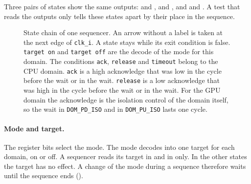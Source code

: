 Three pairs of states show the same outputs:  and ,  and , and  and . A test that reads the outputs only tells these states apart by their place in the sequence.

\begin{figure}[ht]
  \centering
  \caption{State chain of one sequencer. An arrow without a label is taken at the next edge of \texttt{clk\_i}. A state stays while its exit condition is false. \texttt{target on} and \texttt{target off} are the decode of the mode for this domain. The conditions \texttt{ack}, \texttt{release} and \texttt{timeout} belong to the CPU domain. \texttt{ack} is a high acknowledge that was low in the cycle before the wait or in the wait. \texttt{release} is a low acknowledge that was high in the cycle before the wait or in the wait. For the GPU domain the acknowledge is the isolation control of the domain itself, so the wait in \texttt{DOM\_PD\_ISO} and in \texttt{DOM\_PU\_ISO} lasts one cycle.}\label{fig:tm:mod:pmu:fsm}
\end{figure}

\paragraph{Mode and target.} The register bits  select the mode. The mode decodes into one target for each domain, on or off. A sequencer reads its target in  and in  only. In the other states the target has no effect. A change of the mode during a sequence therefore waits until the sequence ends ().

